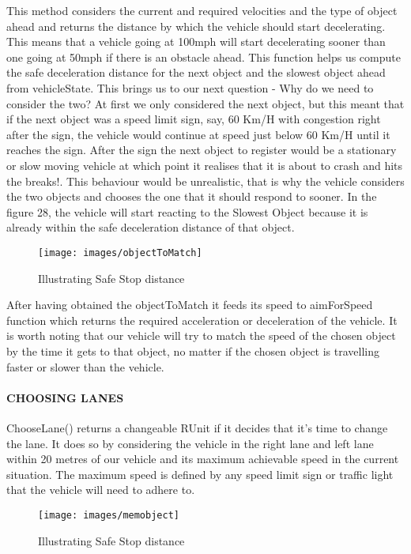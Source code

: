 \documentclass[11pt,a4paper]{article}
\begin{document}
		This method considers the current and required velocities and the type of object ahead and returns the distance by which the vehicle should start decelerating. This means that a vehicle going at 100mph will start decelerating sooner than one going at 50mph if there is an obstacle ahead.
This function helps us compute the safe deceleration distance for the next object and the slowest object ahead from vehicleState. This brings us to our next question - Why do we need to consider the two? At first we only considered the next object, but this meant that if the next object was a speed limit sign, say, 60 Km/H with congestion right after the sign, the vehicle would continue at speed just below 60 Km/H until it reaches the sign. After the sign the next object to register would be a stationary or slow moving vehicle at which point it realises that it is about to crash and hits the breaks!. This behaviour would be unrealistic, that is why the vehicle considers the two objects and chooses the one that it should respond to sooner. In the figure 28, the vehicle will start reacting to the Slowest Object because it is already within the safe deceleration distance of that object.
		
		\begin{figure}[h!]
			\texttt{[image: images/objectToMatch]}
			\caption{Illustrating Safe Stop distance}
			\centering
		\end{figure} 
	After having obtained the objectToMatch it feeds its speed to aimForSpeed function which returns the required acceleration or deceleration of the vehicle. It is worth noting that our vehicle will try to match the speed of the chosen object by the time it gets to that object, no matter if the chosen object is travelling faster or slower than the vehicle. 
		

  	\paragraph{CHOOSING LANES}
  	ChooseLane() returns a changeable RUnit if it decides that it’s time to change the lane. It does so by considering the vehicle in the right lane and left lane within 20 metres of our vehicle and its maximum achievable speed in the current situation. The maximum speed is defined by any speed limit sign or traffic light that the vehicle will need to adhere to.
  	
  	\begin{figure}[h!]
			\texttt{[image: images/memobject]}
			\caption{Illustrating Safe Stop distance}
			\centering
		\end{figure} 
\end{document}
